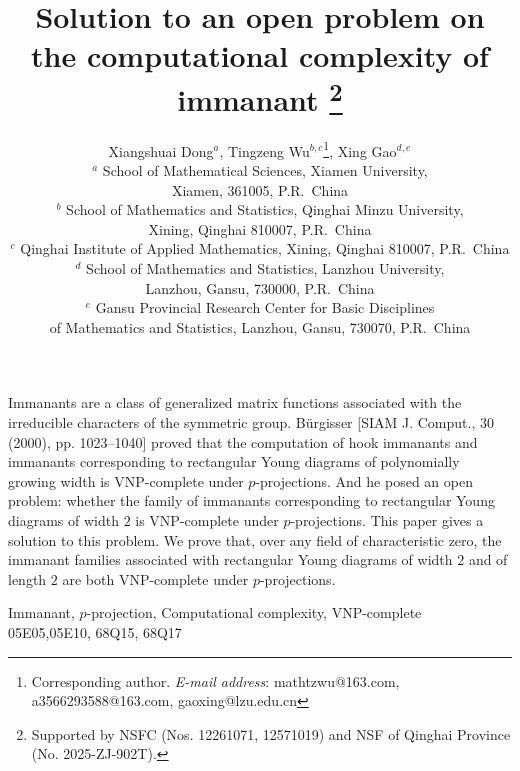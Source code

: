 \documentclass[11pt,a4paper]{article}
\begin{document}
\title
{\LARGE \textbf{Solution to an open problem on the computational complexity of immanant
\thanks{Supported by NSFC (Nos. 12261071,  12571019) and NSF of Qinghai Province (No. 2025-ZJ-902T).} }}

\author{Xiangshuai Dong$^a$, Tingzeng Wu$^{b,c}$\thanks{{Corresponding author.\newline
\emph{E-mail address}: mathtzwu@163.com, a3566293588@163.com,  gaoxing@lzu.edu.cn
}}, Xing Gao$^{d,e}$ \\
{\small $^{a}$ School of Mathematical Sciences, Xiamen University,  }\\
{\small  Xiamen, 361005,  P.R.~China} \\
{\small $^{b}$ School of Mathematics and Statistics, Qinghai Minzu University, }\\
{\small  Xining, Qinghai 810007, P.R.~China} \\
{\small $^{c}$ Qinghai Institute of Applied Mathematics, Xining, Qinghai 810007, P.R.~China}\\
{\small $^{d}$ School of Mathematics and Statistics, Lanzhou University, }\\
{\small  Lanzhou, Gansu, 730000, P.R.~China}\\
{\small $^{e}$ Gansu Provincial Research Center for Basic Disciplines }\\
{\small   of Mathematics
and Statistics, Lanzhou, Gansu, 730070, P.R.~China}}
\date{}

\maketitle
{}
Immanants are a class of generalized matrix functions associated with the irreducible characters of the symmetric group. B\"{u}rgisser [SIAM J. Comput., 30 (2000), pp. 1023--1040] proved that the computation of hook immanants and immanants corresponding to rectangular Young diagrams of polynomially growing width is VNP-complete under $p$-projections. And  he posed an open problem: whether the family of immanants corresponding to rectangular Young diagrams of width $2$ is VNP-complete under $p$-projections. This paper gives a solution to this  problem. 
We prove that, over any field of characteristic zero, the immanant families associated with rectangular Young diagrams of width $2$ and of length $2$ are both VNP-complete under $p$-projections.

{}  Immanant, $p$-projection, Computational complexity, VNP-complete \\
 05E05,05E10, 68Q15, 68Q17
\end{document}
